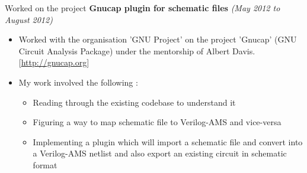 \documentclass[a4paper,11pt]{article}
\newcommand{\isep}{-2 pt}
\begin{document}
\hspace{1mm} Worked on the project \textbf{Gnucap plugin for schematic files} \hfill \emph{(May 2012 to August 2012)} \\[-0.6cm]
    \begin{itemize}
        \item Worked with the organisation 'GNU Project' on the project 'Gnucap' (GNU Circuit Analysis Package) under the mentorship of Albert Davis. \hfill  [\url{http://gnucap.org}] \\[-0.6cm]
        \item My work involved the following :
        \begin{itemize} \itemsep \isep
        \item Reading through the existing codebase to understand it 
        \item Figuring a way to map schematic file to Verilog-AMS and vice-versa
        \item Implementing a plugin which will import a schematic file and convert into a Verilog-AMS netlist and also export an existing circuit in schematic format
        
    \end{itemize}
    \end{itemize} 
\end{document}
